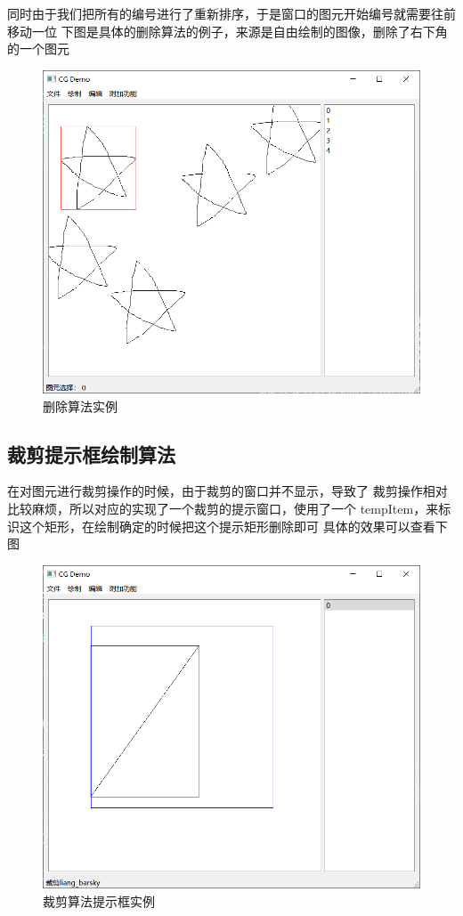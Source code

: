 \documentclass[a4paper,UTF8]{article}
\theoremstyle{definition}
\begin{document}
同时由于我们把所有的编号进行了重新排序，于是窗口的图元开始编号就需要往前移动一位
下图是具体的删除算法的例子，来源是自由绘制的图像，删除了右下角的一个图元
\begin{figure}[htb]
	\centering
	\includegraphics[scale=0.4]{figure/delete.png}
	\caption{删除算法实例}
	\label{fig:delete}
\end{figure}

\subsection{裁剪提示框绘制算法}
在对图元进行裁剪操作的时候，由于裁剪的窗口并不显示，导致了
裁剪操作相对比较麻烦，所以对应的实现了一个裁剪的提示窗口，使用了一个
tempItem，来标识这个矩形，在绘制确定的时候把这个提示矩形删除即可
具体的效果可以查看下图
\begin{figure}[htb]
	\centering
	\includegraphics[scale=0.4]{figure/cutshow.png}
	\caption{裁剪算法提示框实例}
	\label{fig:cutshow}
\end{figure}
\end{document}
